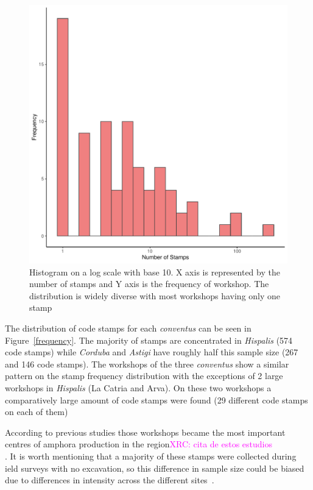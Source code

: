 \documentclass[review]{elsarticle}
\newcommand{\memo}[2]{\textcolor{#1}{#2}}
\newcommand{\xavi}[1]{\memo{magenta}{XRC: #1\\}}
\begin{document}
\begin{figure}[htp]
	\centering
\includegraphics[width=\linewidth]{figs/frequencystamp.pdf}
\caption{Histogram on a log scale with base 10. X axis is represented by the number of stamps and Y axis is the frequency of workshop. The distribution is widely diverse with most workshops having only one stamp}
\label{stamps}
\end{figure} 


The distribution of code stamps for each \textit{conventus} can be seen in Figure~\ref{frequency}. The majority of stamps are concentrated in \textit{Hispalis} (574 code stamps) while \textit{Corduba} and \textit{Astigi} have roughly half this sample size (267 and 146 code stamps). The workshops of the three \textit{conventus} show a similar pattern on the stamp frequency distribution with the exceptions of 2 large workshops in \textit{Hispalis} (La Catria and Arva). On these two workshops a comparatively large amount of code stamps were found (29 different code stamps on each of them)


According to previous studies those workshops became the most important centres of amphora production in the region\xavi{cita de estos estudios}. It is worth mentioning that a majority of these stamps were collected during ield surveys with no excavation, so this difference in sample size could be biased due to differences in intensity across the different sites~\citep{arva_1997}.
 
\end{document}
